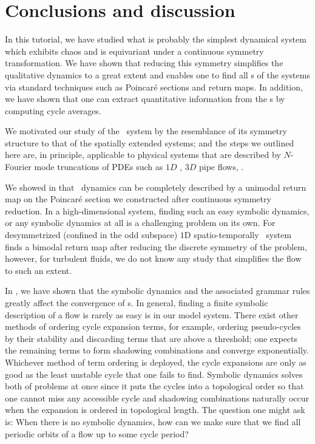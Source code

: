 \section{Conclusions and discussion}
\label{s:concl}

In this tutorial, we have studied what is probably the simplest dynamical system which
exhibits chaos and is equivariant under a continuous symmetry transformation.
We have shown that reducing this symmetry simplifies the qualitative dynamics
to a great extent and enables one to find all \rpo s of the systems via
standard techniques such as Poincar\'e sections and return maps. In
addition, we have shown that one can extract quantitative information
from the \rpo s by computing cycle averages.

We motivated our study of the \twomode\ system by the resemblance of its
symmetry structure to that of the spatially extended systems; and the
steps we outlined here are, in principle, applicable to physical systems
that are described by $N$-Fourier mode truncations of PDEs such as $1D$
\KS{}, $3D$ pipe flows, \etc.

We showed in  that \twomode\ dynamics can be completely
described by a unimodal return map on the Poincar\'e section we constructed
after continuous symmetry reduction. In a high-dimensional system, finding such
an easy symbolic dynamics, or any symbolic dynamics at all is a challenging
problem on its own. For desymmetrized (confined in the odd subspace) $1$D
spatio-temporally \KS\ system  finds a bimodal return map after
reducing the discrete symmetry of the problem, however, for turbulent fluids,
we do not know any study that simplifies the flow to such an extent.

In , we have shown that the symbolic dynamics and the
associated grammar rules greatly affect the convergence of \cycForm s.
In general, finding a finite symbolic description of a flow is
rarely as easy is in our model system.
There exist other methods of ordering cycle
expansion terms, for example, ordering pseudo-cycles by their stability and discarding terms
that are above a threshold; one expects the remaining terms to form
shadowing combinations and converge exponentially.
Whichever method of term ordering is deployed, the cycle expansions are only as good
as the least unstable cycle that one fails to find. Symbolic dynamics solves both
of problems at once since it puts the cycles into a topological order so that
one cannot miss any accessible cycle and shadowing combinations naturally occur
when the expansion is ordered in topological length. The question one might ask
is: When there is no symbolic dynamics, how can we make sure that we find all
periodic orbits of a flow up to some cycle period?

